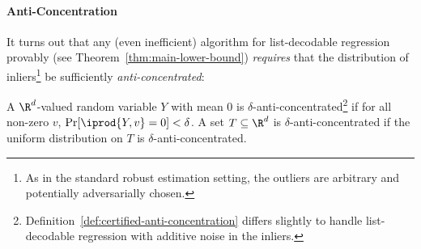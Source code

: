 \paragraph{Anti-Concentration} 
It turns out that any (even inefficient) algorithm for list-decodable regression provably (see Theorem~\ref{thm:main-lower-bound}) \emph{requires} that the distribution of inliers\footnote{As in the standard robust estimation setting, the outliers are  arbitrary and potentially adversarially chosen.} be sufficiently \emph{anti-concentrated}:


\begin{definition}
A $\R^d$-valued random variable $Y$ with mean $0$ is $\delta$-anti-concentrated\footnote{Definition~\ref{def:certified-anti-concentration} differs slightly to handle list-decodable regression with additive noise in the inliers.} if for all non-zero $v$, $\Pr[ \iprod{Y,v} = 0 ] < \delta$. A set $T \subseteq \R^d$ is $\delta$-anti-concentrated if the uniform distribution on $T$ is $\delta$-anti-concentrated.
\end{definition}


 











